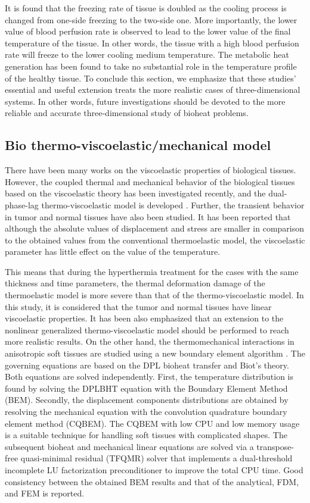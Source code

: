 \documentclass[sn-mathphys]{sn-jnl}%
\theoremstyle{thmstyleone}%
\theoremstyle{thmstyletwo}%
\theoremstyle{thmstylethree}%
\begin{document}
{It is found that the freezing rate of tissue is doubled as the cooling process is changed from one-side freezing to the two-side one. More importantly, the lower value of blood perfusion rate is observed to lead to the lower value of the final temperature of the tissue. In other words, the tissue with a high blood perfusion rate will freeze to the lower cooling medium temperature. The metabolic heat generation has been found to take no substantial role in the temperature profile of the healthy tissue. To conclude this section, we emphasize that these studies' essential and useful extension treats the more realistic cases of three-dimensional systems. In other words, future investigations should be devoted to the more reliable and accurate three-dimensional study of bioheat problems.

\subsection{ Bio thermo-viscoelastic/mechanical model}
There have been many works on the viscoelastic properties of biological tissues. However, the coupled thermal and mechanical behavior of the biological tissues based on the viscoelastic theory has been investigated recently, and the dual-phase-lag thermo-viscoelastic model is developed \cite{XLi2020}. Further, the transient behavior in tumor and normal tissues have also been studied. It has been reported that although the absolute values of displacement and stress are smaller in comparison to the obtained values from the conventional thermoelastic model, the viscoelastic parameter has little effect on the value of the temperature.

This means that during the hyperthermia treatment for the cases with the same thickness and time parameters, the thermal deformation damage of the thermoelastic model is more severe than that of the thermo-viscoelastic model. In this study, it is considered that the tumor and normal tissues have linear viscoelastic properties. It has been also emphasized that an extension to the nonlinear generalized thermo-viscoelastic model should be performed to reach more realistic results. On the other hand, the thermomechanical interactions in anisotropic soft tissues are studied using a new boundary element algorithm \cite{MAFahmy2018}. The governing equations are based on the DPL bioheat transfer and Biot's theory. Both equations are solved independently. First, the temperature distribution is found by solving the DPLBHT equation with the Boundary Element Method (BEM). Secondly, the displacement components distributions are obtained by resolving the mechanical equation with the convolution quadrature boundary element method (CQBEM). The CQBEM with low CPU and low memory usage is a suitable technique for handling soft tissues with complicated shapes. The subsequent bioheat and mechanical linear equations are solved via a transpose-free quasi-minimal residual (TFQMR) solver that implements a dual-threshold incomplete LU factorization preconditioner to improve the total CPU time. Good consistency between the obtained BEM results and that of the analytical, FDM, and FEM is reported.

}
\end{document}

